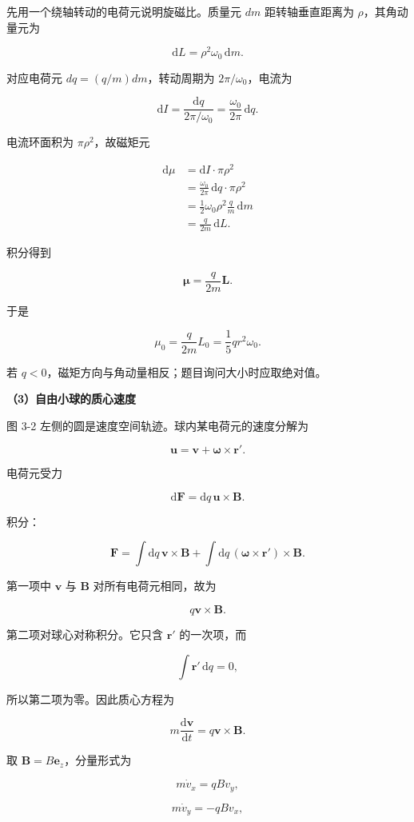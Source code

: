 \documentclass[12pt,a4paper,UTF8]{ctexart}
\begin{document}
先用一个绕轴转动的电荷元说明旋磁比。质量元 \(dm\) 距转轴垂直距离为
\(\rho\)，其角动量元为

\[\mathrm{d}L=\rho^2\omega_0\,\mathrm{d}m.\]

对应电荷元 \(dq=(q/m)dm\)，转动周期为 \(2\pi/\omega_0\)，电流为

\[\mathrm{d}I=\frac{\mathrm{d}q}{2\pi/\omega_0}=\frac{\omega_0}{2\pi}\,\mathrm{d}q.\]

电流环面积为 \(\pi\rho^2\)，故磁矩元

\[\begin{aligned}
\mathrm{d}\mu
&=\mathrm{d}I\cdot\pi\rho^2\\
&=\frac{\omega_0}{2\pi}\,\mathrm{d}q\cdot\pi\rho^2\\
&=\frac12\omega_0\rho^2\frac qm\,\mathrm{d}m\\
&=\frac{q}{2m}\,\mathrm{d}L.
\end{aligned}\]

积分得到

\[\bm\mu=\frac{q}{2m}\bm L.\]

于是

\[\boxed{\mu_0=\frac{q}{2m}L_0=\frac15qr^2\omega_0}.\]

若 \(q<0\)，磁矩方向与角动量相反；题目询问大小时应取绝对值。

\textbf{（3）自由小球的质心速度}

图 3-2 左侧的圆是速度空间轨迹。球内某电荷元的速度分解为

\[\bm u=\bm v+\bm\omega\times\bm r'.\]

电荷元受力

\[\mathrm{d}\bm F=\mathrm{d}q\,\bm u\times\bm B.\]

积分：

\[\bm F=\int \mathrm{d}q\,\bm v\times\bm B
+\int \mathrm{d}q\,(\bm\omega\times\bm r')\times\bm B.\]

第一项中 \(\bm v\) 与 \(\bm B\) 对所有电荷元相同，故为

\[q\bm v\times\bm B.\]

第二项对球心对称积分。它只含 \(\bm r'\) 的一次项，而

\[\int \bm r'\,\mathrm{d}q=0,\]

所以第二项为零。因此质心方程为

\[m\frac{\mathrm{d}\bm v}{\mathrm{d}t}=q\bm v\times\bm B.\]

取 \(\bm B=B\bm e_z\)，分量形式为

\[m\dot v_x=qBv_y,\]

\[m\dot v_y=-qBv_x,\]
\end{document}
